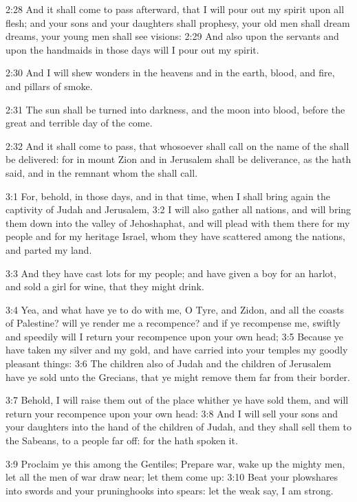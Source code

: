 2:28 And it shall come to pass afterward, that I will pour out my
spirit upon all flesh; and your sons and your daughters shall
prophesy, your old men shall dream dreams, your young men shall see
visions: 2:29 And also upon the servants and upon the handmaids in
those days will I pour out my spirit.

2:30 And I will shew wonders in the heavens and in the earth, blood,
and fire, and pillars of smoke.

2:31 The sun shall be turned into darkness, and the moon into blood,
before the great and terrible day of the \LORD come.

2:32 And it shall come to pass, that whosoever shall call on the name
of the \LORD shall be delivered: for in mount Zion and in Jerusalem
shall be deliverance, as the \LORD hath said, and in the remnant whom
the \LORD shall call.

3:1 For, behold, in those days, and in that time, when I shall bring
again the captivity of Judah and Jerusalem, 3:2 I will also gather all
nations, and will bring them down into the valley of Jehoshaphat, and
will plead with them there for my people and for my heritage Israel,
whom they have scattered among the nations, and parted my land.

3:3 And they have cast lots for my people; and have given a boy for an
harlot, and sold a girl for wine, that they might drink.

3:4 Yea, and what have ye to do with me, O Tyre, and Zidon, and all
the coasts of Palestine? will ye render me a recompence? and if ye
recompense me, swiftly and speedily will I return your recompence upon
your own head; 3:5 Because ye have taken my silver and my gold, and
have carried into your temples my goodly pleasant things: 3:6 The
children also of Judah and the children of Jerusalem have ye sold unto
the Grecians, that ye might remove them far from their border.

3:7 Behold, I will raise them out of the place whither ye have sold
them, and will return your recompence upon your own head: 3:8 And I
will sell your sons and your daughters into the hand of the children
of Judah, and they shall sell them to the Sabeans, to a people far
off: for the \LORD hath spoken it.

3:9 Proclaim ye this among the Gentiles; Prepare war, wake up the
mighty men, let all the men of war draw near; let them come up: 3:10
Beat your plowshares into swords and your pruninghooks into spears:
let the weak say, I am strong.

